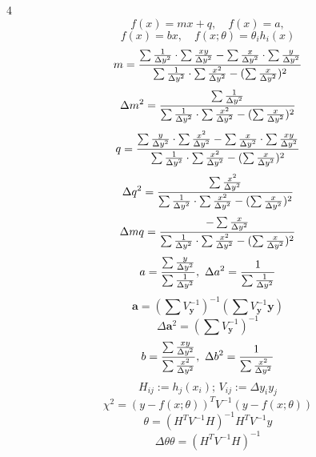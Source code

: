 \documentclass[a4paper]{article}
\newcommand*\D{\Delta}
\newcommand*\titlet[1]{\textbf{\xmakefirstuc{#1}}}
\newenvironment{formulae}[2]{%
\vspace{-19pt}
\begin{multicols}{#1}
\noindent\titlet{#2}}
{\end{multicols}}
\begin{document}
\begin{formulae}{4}{fit (ML)}
	\[f(x)=mx+q,\quad f(x)=a,\]
	\[f(x)=bx,\quad f(x;\theta)=\theta_ih_i(x)\]
	\[m=\frac{\sum\inv{\D y^2}\cdot\sum\frac{xy}{\D y^2}-\sum\frac{x}{\D y^2}\cdot\sum\frac{y}{\D y^2}}{\sum\inv{\D y^2}\cdot\sum\frac{x^2}{\D y^2}-(\sum\frac x{\D y^2})^2}\]
	\[\D m^2=\frac{\sum\inv{\D y^2}}{\sum\inv{\D y^2}\cdot\sum\frac{x^2}{\D y^2}-(\sum\frac{x}{\D y^2})^2}\]
	\[q=\frac{\sum\frac y{\D y^2}\cdot\sum\frac{x^2}{\D y^2}-\sum\frac x{\D y^2}\cdot\sum\frac{xy}{\D y^2}}{\sum\inv{\D y^2}\cdot\sum\frac{x^2}{\D y^2}-(\sum\frac x{\D y^2})^2}\]
	\[\D q^2=\frac{\sum\frac{x^2}{\D y^2}}{\sum\inv{\D y^2}\cdot\sum\frac{x^2}{\D y^2}-(\sum\frac{x}{\D y^2})^2}
	\]
	\[\Delta mq=\frac{-\sum\frac x{\D y^2}}{\sum\inv{\D y^2}\cdot\sum\frac{x^2}{\D y^2}-(\sum\frac{x}{\D y^2})^2}\]
	\[a=\frac{\sum\frac y{\D y^2}}{\sum\inv{\D y^2}},\ \D a^2=\inv{\sum\inv{\D y^2}}\]
	\[\mathbf a=(\sum V_\mathbf y^{-1})^{-1}(\sum V_\mathbf y^{-1}\mathbf y)\]
	\[\D\mathbf a^2=(\sum V_\mathbf y^{-1})^{-1}\]
	\[b=\frac{\sum\frac{xy}{\D y^2}}{\sum\frac{x^2}{\D y^2}},\ \D b^2=\inv{\sum\frac{x^2}{\D y^2}}\]
	\[H_{ij}:=h_j(x_i);\,V_{ij}:=\Delta y_iy_j\]
	\[\chi^2=(y-f(x;\theta))^TV^{-1}(y-f(x;\theta))\]
	\[\theta=(H^TV^{-1}H)^{-1}H^TV^{-1}y\]
	\[\Delta\theta\theta=(H^TV^{-1}H)^{-1}\]
\end{formulae}
\end{document}
